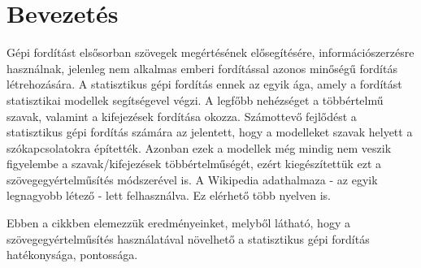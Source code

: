 \section{Bevezetés}
Gépi fordítást elsősorban szövegek megértésének elősegítésére, információszerzésre használnak, jelenleg nem alkalmas emberi fordítással azonos minőségű fordítás létrehozására. A statisztikus gépi fordítás ennek az egyik ága, amely a fordítást statisztikai modellek segítségevel végzi.
A legfőbb nehézséget a többértelmű szavak, valamint a kifejezések fordítása okozza.
Számottevő fejlődést a statisztikus gépi fordítás számára az jelentett, hogy a modelleket szavak helyett a szókapcsolatokra építették. Azonban ezek a modellek még mindig nem veszik figyelembe a szavak/kifejezések többértelműségét, ezért kiegészítettük ezt a szövegegyértelműsítés módszerével is. A Wikipedia adathalmaza - az egyik legnagyobb létező - lett felhasználva. Ez elérhető több nyelven is. 

Ebben a cikkben elemezzük eredményeinket, melyből látható, hogy a szövegegyértelműsítés használatával növelhető a statisztikus gépi fordítás hatékonysága, pontossága.
